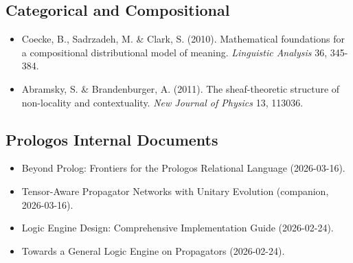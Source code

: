 \documentclass[11pt]{article}
\begin{document}
\subsection{Categorical and Compositional}
\label{sec:org14d4051}
\begin{itemize}
\item Coecke, B., Sadrzadeh, M. \& Clark, S. (2010). Mathematical foundations for a compositional distributional model of meaning. \emph{Linguistic Analysis} 36, 345-384.
\item Abramsky, S. \& Brandenburger, A. (2011). The sheaf-theoretic structure of non-locality and contextuality. \emph{New Journal of Physics} 13, 113036.
\end{itemize}
\subsection{Prologos Internal Documents}
\label{sec:org453a76e}
\begin{itemize}
\item Beyond Prolog: Frontiers for the Prologos Relational Language (2026-03-16).
\item Tensor-Aware Propagator Networks with Unitary Evolution (companion, 2026-03-16).
\item Logic Engine Design: Comprehensive Implementation Guide (2026-02-24).
\item Towards a General Logic Engine on Propagators (2026-02-24).
\end{itemize}
\end{document}
